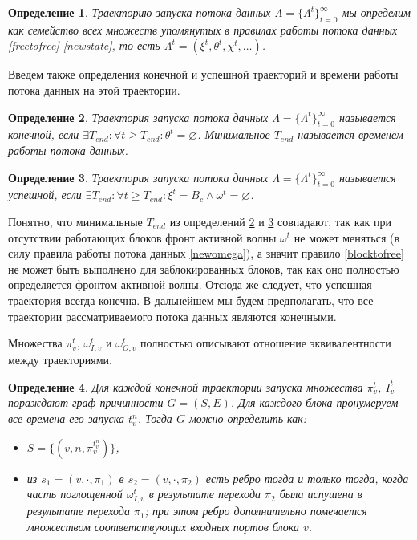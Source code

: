 \documentclass[10pt,a4paper]{article}
\newtheorem{defen}{Определение}
\begin{document}
  \begin{defen}
    Траекторию запуска потока данных $\Lambda = \{\Lambda^t\}_{t=0}^{\infty}$ мы определим как семейство всех множеств упомянутых в
    правилах работы потока данных \eqref{freetofree}-\eqref{newstate}, то есть $\Lambda^t = (\xi^t, \theta^t, \chi^t, \dots)$.
  \end{defen}
  
  Введем также определения конечной и успешной траекторий и времени работы потока данных на этой траектории.
  \begin{defen}
    Траектория запуска потока данных $\Lambda = \{\Lambda^t\}_{t=0}^{\infty}$ называется конечной, если
    $\exists T_{end}: \forall t \geq T_{end}: \theta^t = \varnothing$. Минимальное $T_{end}$ называется временем работы потока данных.
    \label{def:trajectory_finite}
  \end{defen}
  
  \begin{defen}
    Траектория запуска потока данных $\Lambda = \{\Lambda^t\}_{t=0}^{\infty}$ называется успешной, если
    $\exists T_{end}: \forall t \geq T_{end} : \xi^t = B_c \wedge \omega^t = \varnothing$.
    \label{def:trajectory_success}
  \end{defen}
  
  Понятно, что минимальные $T_{end}$ из определений \ref{def:trajectory_finite} и \ref{def:trajectory_success} совпадают, так как при отсутствии работающих
  блоков фронт активной волны $\omega^t$ не может меняться (в силу правила работы потока данных \eqref{newomega}),
  а значит правило \eqref{blocktofree} не может быть выполнено для заблокированных блоков, так как оно полностью определяется фронтом активной волны.
  Отсюда же следует, что успешная траектория всегда конечна.
  В дальнейшем мы будем предполагать, что все траектории рассматриваемого потока данных являются конечными.
  
  Множества $\pi^t_v$, $\omega^t_{I, v}$ и $\omega^t_{O, v}$ полностью описывают отношение эквивалентности между траекториями.
  \begin{defen}
    Для каждой конечной траектории запуска множества $\pi^t_v$, $I^t_v$ пораждают граф причинности $G = (S, E)$.
    Для каждого блока пронумеруем все времена его запуска $t^n_v$. Тогда $G$ можно определить как:
    \begin{itemize}
      \item $S = \{ (v, n, \pi^{t^n_v}_v) \}$,\\
      \item из $s_1 = (v, \cdot, \pi_1)$ в $s_2 = (v, \cdot, \pi_2)$ есть ребро тогда и только тогда,
      когда часть поглощенной $\omega^t_{I, v}$ в результате перехода $\pi_2$ была испушена в результате перехода $\pi_1$;
      при этом ребро дополнительно помечается множеством соответствующих входных портов блока $v$.
    \end{itemize}
  \end{defen}
  
\end{document}
